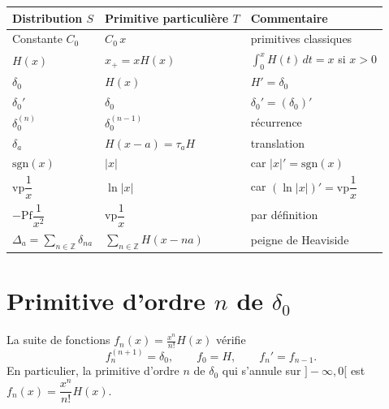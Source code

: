 \documentclass[12pt,a4paper,openany]{book}
\theoremstyle{definition}
\theoremstyle{plain}
\theoremstyle{remark}
\begin{document}
	\begin{theorem}
		\mbox{}
		
		\begin{center}
			\renewcommand{\arraystretch}{1.6}
			\begin{tabular}{@{}lll@{}}
				\toprule
				\textbf{Distribution $S$} & \textbf{Primitive particulière $T$} & \textbf{Commentaire} \\
				\midrule
				Constante $C_0$ & $C_0\,x$ & primitives classiques \\
				$H(x)$ & $x_+ = x H(x)$ & $\int_0^x H(t)\,dt = x$ si $x > 0$ \\
				$\delta_0$ & $H(x)$ & $H' = \delta_0$ \\
				$\delta_0'$ & $\delta_0$ & $\delta_0' = (\delta_0)'$ \\
				$\delta_0^{(n)}$ & $\delta_0^{(n-1)}$ & récurrence \\
				$\delta_a$ & $H(x-a) = \tau_a H$ & translation \\
				$\mathrm{sgn}(x)$ & $|x|$ & car $|x|' = \mathrm{sgn}(x)$ \\
				$\mathrm{vp}\dfrac{1}{x}$ & $\ln|x|$ & car $(\ln|x|)' = \mathrm{vp}\dfrac{1}{x}$ \\
				$-\mathrm{Pf}\dfrac{1}{x^2}$ & $\mathrm{vp}\dfrac{1}{x}$ & par définition \\
				$\Delta_a = \displaystyle\sum_{n\in\mathbb{Z}}\delta_{na}$ & $\displaystyle\sum_{n\in\mathbb{Z}}H(x-na)$ & peigne de Heaviside \\
				\bottomrule
			\end{tabular}
		\end{center}
		\renewcommand{\arraystretch}{1}
	\end{theorem}
	
	\section{Primitive d'ordre \texorpdfstring{$n$}{n} de \texorpdfstring{$\delta_0$}{delta}}
	
	\begin{proposition}
		La suite de fonctions $\displaystyle f_n(x) = \frac{x^n}{n!}H(x)$ vérifie
		\[
		f_n^{(n+1)} = \delta_0, \qquad f_0 = H, \qquad f_n' = f_{n-1}.
		\]
		En particulier, la primitive d'ordre $n$ de $\delta_0$ qui s'annule sur $]-\infty,0[$ est $f_n(x) = \dfrac{x^n}{n!}H(x)$.
	\end{proposition}
	
\end{document}

